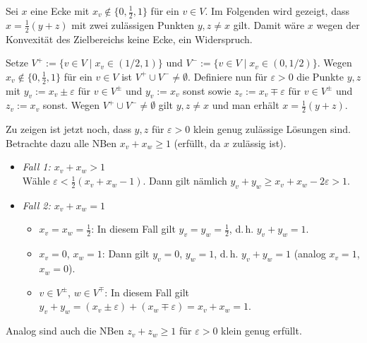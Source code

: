 \begin{Beweis}
    Sei $x$ eine Ecke mit $x_v \notin \{0, \frac{1}{2}, 1\}$ für ein $v \in V$.
    Im Folgenden wird gezeigt, dass $x = \frac{1}{2} (y + z)$ mit
    zwei zulässigen Punkten $y, z \not= x$ gilt.
    Damit wäre $x$ wegen der Konvexität des Zielbereichs keine Ecke, ein Widerspruch.

    Setze $V^+ := \{v \in V \;|\; x_v \in (1/2, 1)\}$ und
    $V^- := \{v \in V \;|\; x_v \in (0, 1/2)\}$.
    Wegen $x_v \notin \{0, \frac{1}{2}, 1\}$ für ein $v \in V$
    ist $V^+ \cup V^- \not= \emptyset$.
    Definiere nun für $\varepsilon > 0$ die Punkte
    $y, z$ mit $y_v := x_v \pm \varepsilon$ für $v \in V^\pm$ und $y_v := x_v$ sonst sowie
    $z_v := x_v \mp \varepsilon$ für $v \in V^\pm$ und $z_v := x_v$ sonst.
    Wegen $V^+ \cup V^- \not= \emptyset$ gilt $y, z \not= x$ und man erhält
    $x = \frac{1}{2} (y + z)$.

    Zu zeigen ist jetzt noch, dass $y, z$ für $\varepsilon > 0$ klein genug
    zulässige Lösungen sind.
    Betrachte dazu alle NBen $x_v + x_w \ge 1$
    (erfüllt, da $x$ zulässig ist).
    \begin{itemize}
        \item
        \emph{Fall 1: $x_v + x_w > 1$}\\
        Wähle $\varepsilon < \frac{1}{2} (x_v + x_w - 1)$.
        Dann gilt nämlich $y_v + y_w \ge x_v + x_w - 2\varepsilon > 1$.

        \item
        \emph{Fall 2: $x_v + x_w = 1$}
        \begin{itemize}
            \item
            $x_v = x_w = \frac{1}{2}$:
            In diesem Fall gilt $y_v = y_w = \frac{1}{2}$, d.\,h. $y_v + y_w = 1$.

            \item
            $x_v = 0$, $x_w = 1$:
            Dann gilt $y_v = 0$, $y_w = 1$, d.\,h. $y_v + y_w = 1$
            (analog $x_v = 1$, $x_w = 0$).


            \item
            $v \in V^\pm$, $w \in V^\mp$:
            In diesem Fall gilt
            $y_v + y_w = (x_v \pm \varepsilon) + (x_w \mp \varepsilon) = x_v + x_w = 1$.
        \end{itemize}
    \end{itemize}
    Analog sind auch die NBen $z_v + z_w \ge 1$ für $\varepsilon > 0$ klein genug erfüllt.
\end{Beweis}

